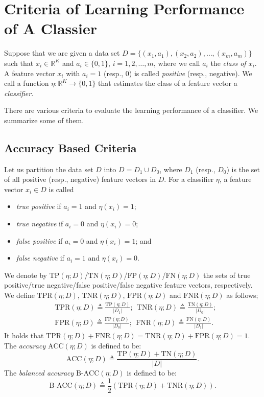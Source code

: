 \documentclass[a4paper,12pt,dvipdfmx]{article}
\title{}
\author{}
\date{}
\begin{document}
\section{Criteria of Learning Performance of A Classier}

Suppose that we are given a data set $D=\{(x_1,a_1),(x_2,a_2),\dots,(x_m,a_m)\}$ such that $x_i\in\mathbb{R}^K$ and $a_i\in\{0,1\}$, $i=1,2,\dots,m$,
where we call $a_i$ the {\em class of $x_i$}.
A feature vector $x_i$ with $a_i=1$ (resp., 0) is called
{\em positive} (resp., negative). 
We call a function $\eta:\mathbb{R}^K\to\{0,1\}$
that estimates the class of a feature vector a {\em classifier}. 

There are various criteria to evaluate the learning performance of a classifier.
We summarize some of them. 

\subsection{Accuracy Based Criteria}
Let us partition the data set $D$
into $D=D_1\cup D_0$,
where $D_1$ (resp., $D_0$)
is the set of all positive (resp., negative) feature vectors in $D$. 
%
For a classifier $\eta$,
a feature vector $x_i\in D$ is called
\begin{itemize}
\item {\em true positive} if $a_i=1$ and $\eta(x_i)=1$;
\item {\em true negative} if $a_i=0$ and $\eta(x_i)=0$;
\item {\em false positive} if $a_i=0$ and $\eta(x_i)=1$; and
\item {\em false negative} if $a_i=1$ and $\eta(x_i)=0$. 
\end{itemize}
We denote by $\textrm{TP}(\eta;D)$/$\textrm{TN}(\eta;D)$/$\textrm{FP}(\eta;D)$/$\textrm{FN}(\eta;D)$
the sets of true positive/true negative/false positive/false negative
feature vectors, respectively.
We define $\textrm{TPR}(\eta;D)$,
$\textrm{TNR}(\eta;D)$,
$\textrm{FPR}(\eta;D)$ and $\textrm{FNR}(\eta;D)$ as follows;
\begin{align*}
  &\textrm{TPR}(\eta;D)\triangleq\frac{\textrm{TP}(\eta;D)}{|D_1|};\ \ 
  \textrm{TNR}(\eta;D)\triangleq\frac{\textrm{TN}(\eta;D)}{|D_0|};\\
  &\textrm{FPR}(\eta;D)\triangleq\frac{\textrm{FP}(\eta;D)}{|D_0|};\ \ 
  \textrm{FNR}(\eta;D)\triangleq\frac{\textrm{FN}(\eta;D)}{|D_1|}.
\end{align*}
It holds that $\textrm{TPR}(\eta;D)+\textrm{FNR}(\eta;D)=\textrm{TNR}(\eta;D)+\textrm{FPR}(\eta;D)=1$. 
%
The {\em accuracy} $\textrm{ACC}(\eta;D)$ is defined to be:
\[
\textrm{ACC}(\eta;D)\triangleq\frac{\textrm{TP}(\eta;D)+\textrm{TN}(\eta;D)}{|D|}.
\]
The {\em balanced accuracy} $\textrm{B-ACC}(\eta;D)$ is defined to be:
\[
\textrm{B-ACC}(\eta;D)\triangleq\frac{1}{2}(\textrm{TPR}(\eta;D)+\textrm{TNR}(\eta;D)).
\]
\end{document}

